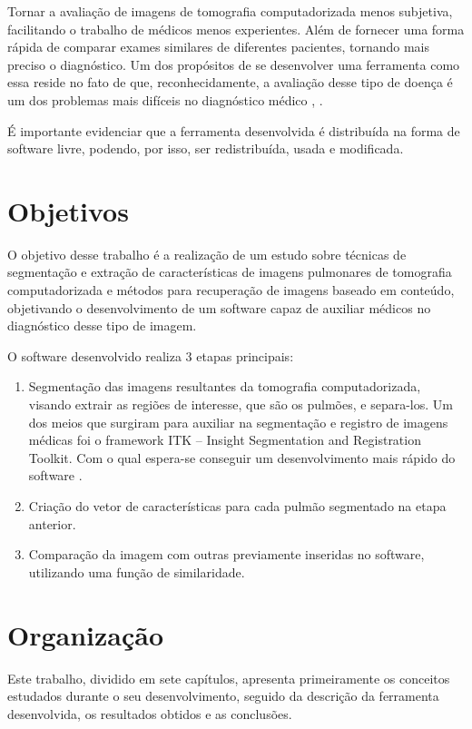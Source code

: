 Tornar a avaliação de imagens de tomografia computadorizada menos subjetiva, facilitando o trabalho de médicos menos experientes. Além de fornecer uma forma rápida de comparar exames similares de diferentes pacientes, tornando mais preciso o diagnóstico. Um dos propósitos de se desenvolver uma ferramenta como essa reside no fato de que, reconhecidamente, a avaliação desse tipo de doença é um dos problemas mais difíceis no diagnóstico médico \cite{doi}, \cite{bick}.

É importante evidenciar que a ferramenta desenvolvida é distribuída na forma de software livre, podendo, por isso, ser redistribuída, usada e modificada.

\section{Objetivos}

O objetivo desse trabalho é a realização de um estudo sobre técnicas de segmentação e extração de características de imagens pulmonares de tomografia computadorizada e métodos para recuperação de imagens baseado em conteúdo, objetivando o desenvolvimento de um software capaz de auxiliar médicos no diagnóstico desse tipo de imagem.

O software desenvolvido realiza 3 etapas principais:
\begin{enumerate}
 \item Segmentação das imagens resultantes da tomografia computadorizada, visando extrair as regiões de interesse, que são os pulmões, e separa-los. Um dos meios que surgiram para auxiliar na segmentação e registro de imagens médicas foi o framework ITK – Insight Segmentation and Registration Toolkit. Com o qual espera-se conseguir um desenvolvimento mais rápido do software \cite{yoo}.
 \item Criação do vetor de características para cada pulmão segmentado na etapa anterior.
 \item Comparação da imagem com outras previamente inseridas no software, utilizando uma função de similaridade.
\end{enumerate}

\section{Organização}

Este trabalho, dividido em sete capítulos, apresenta primeiramente os conceitos estudados durante o seu desenvolvimento, seguido da descrição da ferramenta desenvolvida, os resultados obtidos e as conclusões.

